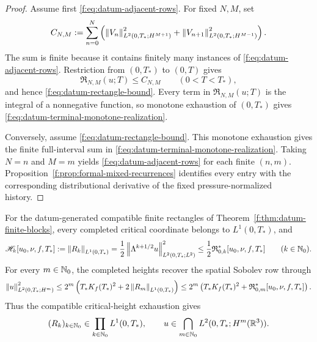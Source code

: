 \begin{proof}
Assume first \eqref{f:eq:datum-adjacent-rows}.  For fixed \(N,M\), set
\[
 C_{N,M}:=
 \sum_{n=0}^{N}\left(
  \left\lVert V_n\right\rVert_{L^2(0,T_*;H^{M+1})}^2
  +\left\lVert V_{n+1}\right\rVert_{L^2(0,T_*;H^{M-1})}^2
 \right).
\]
The sum is finite because it contains finitely many instances of
\eqref{f:eq:datum-adjacent-rows}.  Restriction from \((0,T_*)\) to \((0,T)\)
gives
\[
 \mathfrak R_{N,M}(u;T)\le C_{N,M}
 \qquad(0<T<T_*),
\]
and hence \eqref{f:eq:datum-rectangle-bound}.
Every term in \(\mathfrak R_{N,M}(u;T)\) is the integral of a nonnegative
function, so monotone exhaustion of \((0,T_*)\) gives
\eqref{f:eq:datum-terminal-monotone-realization}.

Conversely, assume \eqref{f:eq:datum-rectangle-bound}.  This monotone
exhaustion gives the finite full-interval sum in
\eqref{f:eq:datum-terminal-monotone-realization}.  Taking \(N=n\) and \(M=m\)
yields \eqref{f:eq:datum-adjacent-rows} for each finite \((n,m)\).
Proposition~\ref{f:prop:formal-mixed-recurrences} identifies every entry with
the corresponding distributional derivative of the fixed pressure-normalized
history.
\end{proof}

\begin{corollary}
\label{f:cor:datum-critical-height-completion}
For the datum-generated compatible finite rectangles of
Theorem~\ref{f:thm:datum-finite-blocks}, every completed critical coordinate
belongs to \(L^1(0,T_*)\), and
\begin{equation}
 \mathscr H_k[u_0,\nu,f,T_*]
 :=\left\lVert R_k\right\rVert_{L^1(0,T_*)}
 =\frac12\left\lVert \Lambda^{k+1/2}u\right\rVert_{L^2(0,T_*;L^2)}^2
 \le\frac12\mathfrak R_{0,k}^*[u_0,\nu,f,T_*]
 \qquad(k\in\mathbb N_0).
 \label{f:eq:datum-completed-height-bound}
\end{equation}
For every \(m\in\mathbb N_0\), the completed heights recover the spatial Sobolev
row through
\begin{equation}
 \left\lVert u\right\rVert_{L^2(0,T_*;H^m)}^2
 \le
 2^m\left(
  T_*K_f(T_*)^2+2\left\lVert R_m\right\rVert_{L^1(0,T_*)}
 \right)
 \le
 2^m\left(
  T_*K_f(T_*)^2+\mathfrak R_{0,m}^*[u_0,\nu,f,T_*]
 \right).
 \label{f:eq:datum-height-to-spatial-column}
\end{equation}
Thus the compatible critical-height exhaustion gives
\begin{equation}
 (R_k)_{k\in\mathbb N_0}\in\prod_{k\in\mathbb N_0}L^1(0,T_*),
 \qquad
 u\in\bigcap_{m\in\mathbb N_0}L^2(0,T_*;H^m(\mathbb R^3)).
 \label{f:eq:datum-complete-height-and-spatial-columns}
\end{equation}
\end{corollary}

